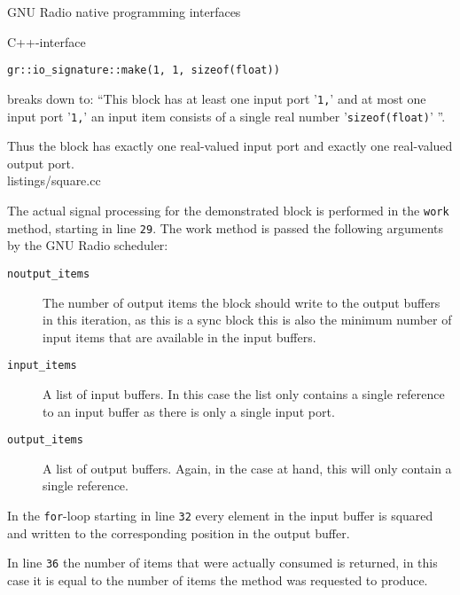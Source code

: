 \begin{subchapter}{GNU Radio native programming interfaces}
\begin{subsubchapter}{C++-interface}
    \begin{center}
      \texttt{gr::io\_signature::make(1, 1, sizeof(float))}
    \end{center}

    breaks down to: ``This block has at least one input port '\texttt{1,}' and
    at most one input port '\texttt{1,}' an input item consists of a single real
    number '\texttt{sizeof(float)}' ''.

    Thus the block has exactly one real-valued input port and exactly
    one real-valued output port. \\

    
                    {listings/square.cc}

    The actual signal processing for the demonstrated block
    is performed in the \texttt{work} method, starting in line
    \texttt{29}. The work method is passed the following arguments
    by the GNU Radio scheduler:

    \begin{description}
      \item[\texttt{noutput\_items}]
        The number of output items the block should write to the output
        buffers in this iteration, as this is a sync block this is also
        the minimum number of input items that are available in the input buffers.

      \item[\texttt{input\_items}]
        A list of input buffers. In this case the list only contains
        a single reference to an input buffer as there is only a
        single input port.

      \item[\texttt{output\_items}]
        A list of output buffers. Again, in the case at hand,
        this will only contain a single reference.
    \end{description}
  \end{subsubchapter}

  In the \texttt{for}-loop starting in line \texttt{32}
  every element in the input buffer is squared and written to
  the corresponding position in the output buffer.

  In line \texttt{36} the number of items that were actually consumed
  is returned, in this case it is equal to the number of items
  the method was requested to produce.
\end{subchapter}
